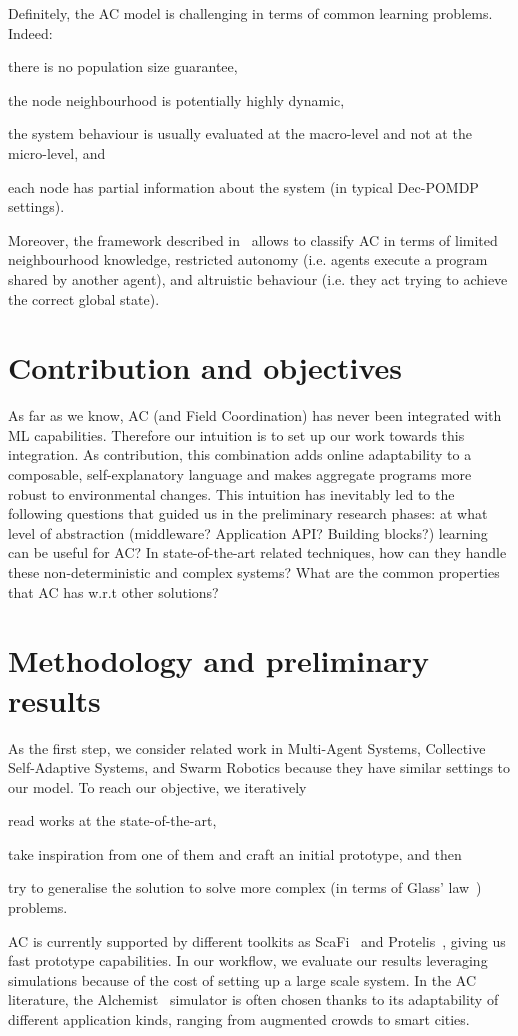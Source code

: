\documentclass[conference]{IEEEtran}
\begin{document}
Definitely, the AC model is challenging in terms of common learning problems. Indeed:
\begin{enumerate*}[label=(\roman*)]
\item there is no population size guarantee,
\item the node neighbourhood is potentially highly dynamic,
\item the system behaviour is usually evaluated at the macro-level and not at the micro-level, and
\item each node has partial information about the system (in typical Dec-POMDP~\cite{DBLP:conf/uai/BernsteinZI00} settings).
\end{enumerate*}
Moreover, the framework described in~\cite{DAngelo2019} allows to classify AC in terms of limited neighbourhood knowledge, restricted autonomy (i.e. agents execute a program shared by another agent), and altruistic behaviour (i.e. they act trying to achieve the correct global state).
\section{Contribution and objectives}
As far as we know, AC (and Field Coordination) has never been integrated with ML capabilities.
%
Therefore our intuition is to set up our work towards this integration.
%
As contribution, this combination adds online adaptability to a composable, self-explanatory language and makes aggregate programs more robust to environmental changes.
%
This intuition has inevitably led to the following questions that guided us in the preliminary research phases: 
at what level of abstraction (middleware? Application API? Building blocks?) learning can be useful for AC?
%
In state-of-the-art related techniques, how can they handle these non-deterministic and complex systems?
%
What are the common properties that AC has w.r.t other solutions?
\section{Methodology and preliminary results}
%
As the first step, we consider related work in Multi-Agent Systems, Collective Self-Adaptive Systems, and Swarm Robotics because they have similar settings to our model.
To reach our objective, we iteratively 
\begin{enumerate*}[label=(\roman*)]
\item read works at the state-of-the-art,
\item take inspiration from one of them and craft an initial prototype, and then
\item try to generalise the solution to solve more complex (in terms of Glass' law~\cite{DBLP:journals/software/Glass01}) problems.
\end{enumerate*}
AC is currently supported by different toolkits as ScaFi~\cite{DBLP:conf/ecoop/CasadeiV16} and Protelis~\cite{DBLP:conf/sac/PianiniVB15}, giving us fast prototype capabilities.
%
In our workflow, we evaluate our results leveraging simulations because of the cost of setting up a large scale system.
%
In the AC literature, the Alchemist~\cite{alchemist-jos2013} simulator is often chosen thanks to its adaptability of different application kinds, ranging from augmented crowds to smart cities.
\end{document}
